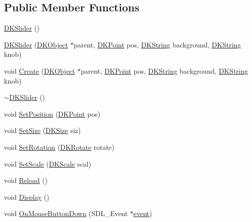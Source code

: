 \subsection*{Public Member Functions}
\begin{DoxyCompactItemize}
\item 
\hyperlink{class_d_k_slider_a4972c90b6c0a575c61b902966967ae3e}{D\-K\-Slider} ()
\item 
\hyperlink{class_d_k_slider_a800855ffffee06c1fc016d12135a8b24}{D\-K\-Slider} (\hyperlink{class_d_k_object}{D\-K\-Object} $\ast$parent, \hyperlink{_d_k_axis_8h_a0ca1f005fbb936f8e7a7f2433591f418}{D\-K\-Point} pos, \hyperlink{_d_k_string_8h_ac168e8555ceba18e1a2919b21976bc84}{D\-K\-String} background, \hyperlink{_d_k_string_8h_ac168e8555ceba18e1a2919b21976bc84}{D\-K\-String} knob)
\item 
void \hyperlink{class_d_k_slider_a5eba5756fbaf2dbb7aa864dc4ab344ff}{Create} (\hyperlink{class_d_k_object}{D\-K\-Object} $\ast$parent, \hyperlink{_d_k_axis_8h_a0ca1f005fbb936f8e7a7f2433591f418}{D\-K\-Point} pos, \hyperlink{_d_k_string_8h_ac168e8555ceba18e1a2919b21976bc84}{D\-K\-String} background, \hyperlink{_d_k_string_8h_ac168e8555ceba18e1a2919b21976bc84}{D\-K\-String} knob)
\item 
\hyperlink{class_d_k_slider_ab30ed9cfc6ba61eb229eb73daa9dcf61}{$\sim$\-D\-K\-Slider} ()
\item 
void \hyperlink{class_d_k_slider_a4edaf0ca453eb257ab982f1ef28daf63}{Set\-Position} (\hyperlink{_d_k_axis_8h_a0ca1f005fbb936f8e7a7f2433591f418}{D\-K\-Point} pos)
\item 
void \hyperlink{class_d_k_slider_abde7b913e33e034ce8ed68fe4656f13b}{Set\-Size} (\hyperlink{_d_k_axis_8h_aaa25a8c7cbf504fffdb8a4208ff7a731}{D\-K\-Size} siz)
\item 
void \hyperlink{class_d_k_slider_ada1c83321bb863ec0b6ec974aca4da65}{Set\-Rotation} (\hyperlink{_d_k_axis_8h_a886498401ce03ee3a95cb58785ab475a}{D\-K\-Rotate} rotate)
\item 
void \hyperlink{class_d_k_slider_a9ac386933507bb5872408261ed52b43c}{Set\-Scale} (\hyperlink{_d_k_axis_8h_ab9e555d97d32f68d4c77474d1e1ba787}{D\-K\-Scale} scal)
\item 
void \hyperlink{class_d_k_slider_a35ad8382f8594efb06302042574a2ef7}{Reload} ()
\item 
void \hyperlink{class_d_k_slider_a97a2ad09259c1212c22efecdc0ee14e5}{Display} ()
\item 
void \hyperlink{class_d_k_slider_afeb2a870dfd2d11945374b5c9da6764a}{On\-Mouse\-Button\-Down} (S\-D\-L\-\_\-\-Event $\ast$\hyperlink{class_d_k_event_a3deebb932ed734363c4ece87971bc45f}{event})

\end{DoxyCompactItemize}
